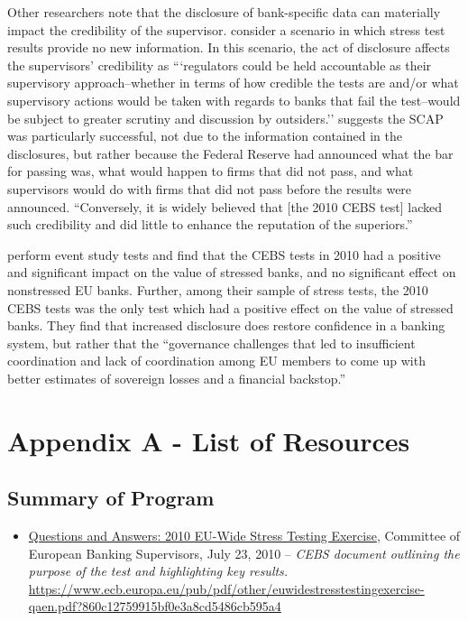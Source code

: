 \documentclass[12pt]{article}
\begin{document}
Other researchers note that the disclosure of bank-specific data can materially impact the credibility of the supervisor. \citet{Itay} consider a scenario in which stress test results provide no new information. In this scenario, the act of disclosure affects the supervisors' credibility as ```regulators could be held accountable as their supervisory approach--whether in terms of how credible the tests are and/or what supervisory actions would be taken with regards to banks that fail the test--would be subject to greater scrutiny and discussion by outsiders.'' \citet{Itay} suggests the SCAP was particularly successful, not due to the information contained in the disclosures, but rather because the Federal Reserve had announced what the bar for passing was, what would happen to firms that did not pass, and what supervisors would do with firms that did not pass before the results were announced. ``Conversely, it is widely believed that [the 2010 CEBS test] lacked such credibility and did little to enhance the reputation of the superiors.''

\citet{Candelon} perform event study tests and find that the CEBS tests in 2010 had a positive and significant impact on the value of stressed banks, and no significant effect on nonstressed EU banks. Further, among their sample of stress tests, the 2010 CEBS tests was the only test which had a positive effect on the value of stressed banks. They find that increased disclosure does restore confidence in a banking system, but rather that the ``governance challenges that led to insufficient coordination and lack of coordination among EU members to come up with better estimates of sovereign losses and a financial backstop.''

\newpage
{}


\nocite{*}


\newpage


\section{Appendix A - List of Resources}

\subsection{Summary of Program}

\begin{itemize}
\item
\ul{Questions and Answers: 2010 EU-Wide Stress Testing Exercise}, Committee of European Banking Supervisors, July 23, 2010 -- \emph{CEBS
  document outlining the purpose of the test and highlighting key results.} \url{https://www.ecb.europa.eu/pub/pdf/other/euwidestresstestingexercise-qaen.pdf?860c12759915bf0e3a8cd5486cb595a4}
\end{itemize}
\end{document}
